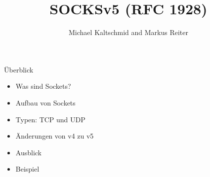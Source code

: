 \documentclass[t]{beamer}
\title{SOCKSv5 (RFC 1928)}
\author{Michael Kaltschmid and Markus Reiter}
\date{\printdate{2017-06-13}}
\begin{document}
  \maketitle

  \begin{frame}{Überblick}
    \begin{itemize}
      \item Was sind Sockets?
      \item Aufbau von Sockets
      \item Typen: TCP und UDP
      \item Änderungen von v4 zu v5
      \item Ausblick
      \item Beispiel
    \end{itemize}
  \end{frame}
\end{document}
